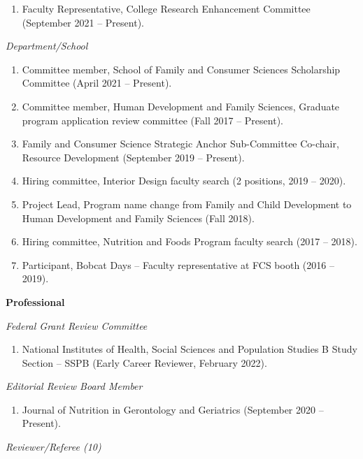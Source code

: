 \documentclass[
]{article}
\providecommand{\tightlist}{%
  \setlength{\itemsep}{0pt}\setlength{\parskip}{0pt}}
\begin{document}
\begin{enumerate}
\def\labelenumi{\arabic{enumi}.}
\tightlist
\item
  Faculty Representative, College Research Enhancement Committee
  (September 2021 -- Present).
\end{enumerate}

\emph{Department/School}

\begin{enumerate}
\def\labelenumi{\arabic{enumi}.}
\item
  Committee member, School of Family and Consumer Sciences Scholarship
  Committee (April 2021 -- Present).
\item
  Committee member, Human Development and Family Sciences, Graduate
  program application review committee (Fall 2017 -- Present).
\item
  Family and Consumer Science Strategic Anchor Sub-Committee Co-chair,
  Resource Development (September 2019 -- Present).
\item
  Hiring committee, Interior Design faculty search (2 positions, 2019 --
  2020).
\item
  Project Lead, Program name change from Family and Child Development to
  Human Development and Family Sciences (Fall 2018).
\item
  Hiring committee, Nutrition and Foods Program faculty search (2017 --
  2018).
\item
  Participant, Bobcat Days -- Faculty representative at FCS booth (2016
  -- 2019).
\end{enumerate}

\textbf{Professional}

\emph{Federal Grant Review Committee}

\begin{enumerate}
\def\labelenumi{\arabic{enumi}.}
\tightlist
\item
  National Institutes of Health, Social Sciences and Population Studies
  B Study Section -- SSPB (Early Career Reviewer, February 2022).
\end{enumerate}

\emph{Editorial Review Board Member}

\begin{enumerate}
\def\labelenumi{\arabic{enumi}.}
\tightlist
\item
  Journal of Nutrition in Gerontology and Geriatrics (September 2020 --
  Present).
\end{enumerate}

\emph{Reviewer/Referee (10)}
\end{document}

